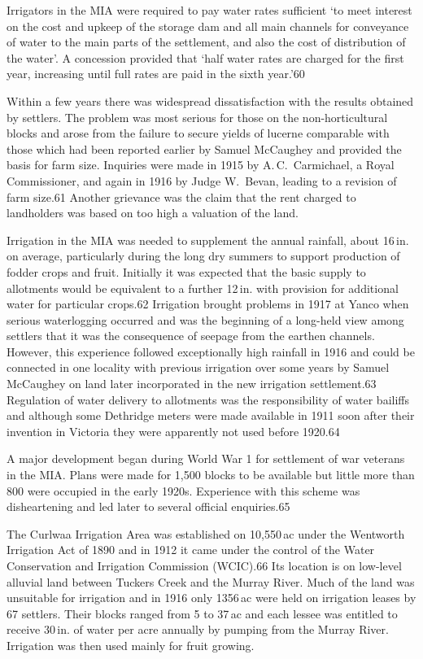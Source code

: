 Irrigators in the MIA were required to pay water rates sufficient `to
meet interest on the cost and upkeep of the storage dam and all main
channels for conveyance of water to the main parts of the settlement,
and also the cost of distribution of the water'. A concession provided
that `half water rates are charged for the first year, increasing
until full rates are paid in the sixth year.'60

Within a few years there was widespread dissatisfaction with the
results obtained by settlers.  The problem was most serious for those
on the non-horticultural blocks and arose from the failure to secure
yields of lucerne comparable with those which had been reported
earlier by Samuel McCaughey and provided the basis for farm size.
Inquiries were made in 1915 by A.\,C.~Carmichael, a Royal
Commissioner, and again in 1916 by Judge W.~Bevan, leading to a
revision of farm size.61 Another grievance was the claim that the rent
charged to landholders was based on too high a valuation of the land.

Irrigation in the MIA was needed to supplement the annual rainfall,
about 16\,in. on average, particularly during the long dry summers to
support production of fodder crops and fruit.  Initially it was
expected that the basic supply to allotments would be equivalent to a
further 12\,in. with provision for additional water for particular
crops.62 Irrigation brought problems in 1917 at Yanco when serious
waterlogging occurred and was the beginning of a long-held view among
settlers that it was the consequence of seepage from the earthen
channels.  However, this experience followed exceptionally high
rainfall in 1916 and could be connected in one locality with previous
irrigation over some years by Samuel McCaughey on land later
incorporated in the new irrigation settlement.63 Regulation of water
delivery to allotments was the responsibility of water bailiffs and
although some Dethridge meters were made available in 1911 soon after
their invention in Victoria they were apparently not used before
1920.64

A major development began during World War 1 for settlement of war
veterans in the MIA.  Plans were made for 1,500 blocks to be available
but little more than 800 were occupied in the early 1920s. Experience
with this scheme was disheartening and led later to several official
enquiries.65

The Curlwaa Irrigation Area was established on 10,550\,ac under the
Wentworth Irrigation Act of 1890 and in 1912 it came under the control
of the Water Conservation and Irrigation Commission (WCIC).66 Its
location is on low-level alluvial land between Tuckers Creek and the
Murray River. Much of the land was unsuitable for irrigation and in
1916 only 1356\,ac were held on irrigation leases by 67 settlers.
Their blocks ranged from 5 to 37\,ac and each lessee was entitled to
receive 30\,in. of water per acre annually by pumping from the Murray
River.  Irrigation was then used mainly for fruit growing.

